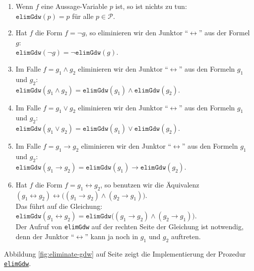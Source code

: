 \begin{enumerate}
\item Wenn $f$ eine
      Aussage-Variable $p$ ist, so ist nichts zu tun:
      \\[0.2cm]
      \hspace*{1.3cm}
      $\mathtt{elimGdw}(p) = p$ \quad f\"{u}r alle $p \in \mathcal{P}$.
\item Hat $f$ die Form $f = \neg g$, so eliminieren wir den Junktor
      ``$\leftrightarrow$'' aus der Formel $g$: \\[0.2cm]
      \hspace*{1.3cm} 
      $\mathtt{elimGdw}(\neg g) = \neg \mathtt{elimGdw}(g)$.
\item Im Falle $f = g_1 \wedge g_2$ eliminieren wir den Junktor
      ``$\leftrightarrow$'' aus den Formeln $g_1$ und $g_2$: \\[0.2cm]
      \hspace*{1.3cm} 
      $\mathtt{elimGdw}(g_1 \wedge g_2) = \mathtt{elimGdw}(g_1) \wedge \mathtt{elimGdw}(g_2)$.
\item Im Falle $f = g_1 \vee g_2$ eliminieren wir den Junktor
      ``$\leftrightarrow$'' aus den Formeln $g_1$ und $g_2$: \\[0.2cm]
      \hspace*{1.3cm} 
      $\mathtt{elimGdw}(g_1 \vee g_2) = \mathtt{elimGdw}(g_1) \vee \mathtt{elimGdw}(g_2)$.
\item Im Falle $f = g_1 \rightarrow g_2$ eliminieren wir den Junktor
      ``$\leftrightarrow$'' aus den Formeln $g_1$ und $g_2$: \\[0.2cm]
      \hspace*{1.3cm} 
      $\mathtt{elimGdw}(g_1 \rightarrow g_2) = \mathtt{elimGdw}(g_1) \rightarrow \mathtt{elimGdw}(g_2)$.
\item Hat $f$ die Form $f = g_1 \leftrightarrow g_2$, so benutzen wir die
      \"{A}quivalenz \\[0.2cm]
      \hspace*{1.3cm} 
      $(g_1 \leftrightarrow g_2) \leftrightarrow \bigl( (g_1 \rightarrow g_2) \wedge (g_2 \rightarrow g_1)\bigr)$.
      \\[0.2cm]
      Das f\"{u}hrt auf die Gleichung:
      \\[0.2cm]
      \hspace*{1.3cm} 
      $\mathtt{elimGdw}(g_1 \leftrightarrow g_2) = \mathtt{elimGdw}\bigl( (g_1 \rightarrow g_2) \wedge (g_2 \rightarrow g_1)\bigr)$. 
      \\[0.2cm]
      Der Aufruf von \texttt{elimGdw} auf der rechten Seite der Gleichung ist notwendig,
      denn der Junktor ``$\leftrightarrow$'' kann ja noch in $g_1$ und $g_2$ auftreten.
\end{enumerate}
Abbildung
\ref{fig:eliminate-gdw} auf Seite \pageref{fig:eliminate-gdw} zeigt die Implementierung der
Prozedur 
\href{https://github.com/karlstroetmann/Logik/blob/master/SetlX/knf.stlx}{\texttt{elimGdw}}.

